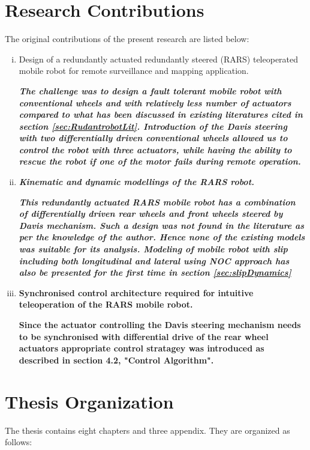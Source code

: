 \section{Research Contributions}
The original contributions of the present research are listed below:
\begin{enumerate}[(i)]

\item Design of a redundantly actuated redundantly steered (RARS)  teleoperated mobile robot for remote surveillance and mapping application.

 \textbf{\textit{The challenge was to design a fault tolerant mobile robot with conventional wheels and with relatively less number of actuators compared to what has been discussed in existing literatures cited in section \ref{sec:RudantrobotLit}. Introduction of the Davis steering with two differentially  driven  conventional wheels allowed us to control the robot with three actuators, while having the ability to rescue the robot if one of the motor fails during remote operation.} }
		
 
	
\item \textbf{\textit{ Kinematic and dynamic modellings of the RARS robot.}}


		 \textbf{\textit{This redundantly actuated RARS mobile robot  has a combination of differentially driven rear wheels and front wheels steered by  Davis mechanism. Such a design was not found in the literature as per the knowledge of the author. Hence none of the existing models was suitable for its analysis. Modeling of mobile robot with slip including both longitudinal and lateral using NOC approach has also be presented for the first time in section \ref{sec:slipDynamics}  }} 
		
%	
	   
\item \textbf{Synchronised control architecture required for intuitive teleoperation of the RARS mobile robot.} 

\textbf{Since the actuator controlling the Davis steering mechanism needs to be synchronised with differential drive of the rear wheel actuators appropriate control stratagey was introduced as described in section 4.2, "Control Algorithm".}




\end{enumerate}
\section{Thesis Organization}
The thesis contains eight chapters and three appendix. They are organized as follows:
